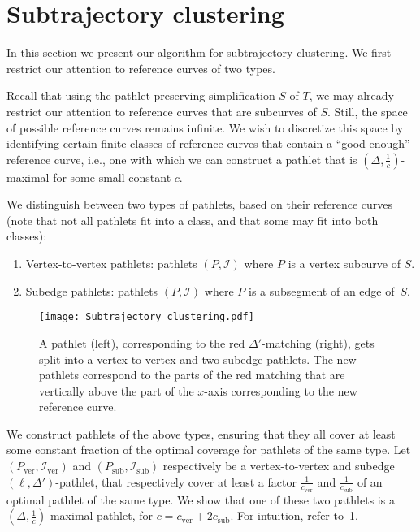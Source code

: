 \documentclass[a4paper,UKenglish,cleveref,thm-restate,notab]{lipics-v2021}
\newcommand{\I}{\mathcal{I}}
\newcommand{\ver}{\mathrm{ver}}
\newcommand{\sub}{\mathrm{sub}}
\begin{document}
\section{Subtrajectory clustering}
\label{sec:the_algorithm}

    In this section we present our algorithm for subtrajectory clustering.
    We first restrict our attention to reference curves of two types.
    
    Recall that using the pathlet-preserving simplification $S$ of $T$, we may already restrict our attention to reference curves that are subcurves of $S$.
    Still, the space of possible reference curves remains infinite.
    We wish to discretize this space by identifying certain finite classes of reference curves that contain a ``good enough'' reference curve, i.e., one with which we can construct a pathlet that is $(\Delta, \frac{1}{c})$-maximal for some small constant $c$.

    We distinguish between two types of pathlets, based on their reference curves (note that not all pathlets fit into a class, and that some may fit into both classes):
    \begin{enumerate}
        \item Vertex-to-vertex pathlets: pathlets $(P, \I)$ where $P$ is a vertex subcurve of $S$.
        \item Subedge pathlets: pathlets $(P, \I)$ where $P$ is a subsegment of an edge of~$S$.
    \end{enumerate}

    \begin{figure}
        \centering
        \texttt{[image: Subtrajectory\_clustering.pdf]}
        \caption{A pathlet (left), corresponding to the red $\Delta'$-matching (right), gets split into a vertex-to-vertex and two subedge pathlets.
        The new pathlets correspond to the parts of the red matching that are vertically above the part of the $x$-axis corresponding to the new reference curve.
        }
        \label{fig:splitting_pathlets}
    \end{figure}

\noindent
    We construct pathlets of the above types, ensuring that they all cover at least some constant fraction of the optimal coverage for pathlets of the same type.
    Let $(P_\ver, \I_\ver)$ and $(P_\sub, \I_\sub)$ respectively be a vertex-to-vertex and subedge $(\ell, \Delta')$-pathlet, that respectively cover at least a factor $\frac{1}{c_\ver}$ and $\frac{1}{c_\sub}$ of an optimal pathlet of the same type.
    We show that one of these two pathlets is a $(\Delta, \frac{1}{c})$-maximal pathlet, for $c = c_\ver + 2c_\sub$.
    For intuition, refer to~\cref{fig:splitting_pathlets}.
\end{document}
